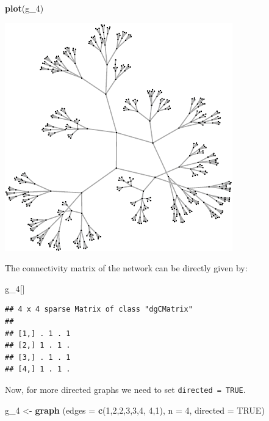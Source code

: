 \documentclass[]{article}
\newenvironment{Shaded}{\begin{snugshade}}{\end{snugshade}}
\newcommand{\KeywordTok}[1]{\textcolor[rgb]{0.13,0.29,0.53}{\textbf{#1}}}
\newcommand{\DataTypeTok}[1]{\textcolor[rgb]{0.13,0.29,0.53}{#1}}
\newcommand{\DecValTok}[1]{\textcolor[rgb]{0.00,0.00,0.81}{#1}}
\newcommand{\StringTok}[1]{\textcolor[rgb]{0.31,0.60,0.02}{#1}}
\newcommand{\OtherTok}[1]{\textcolor[rgb]{0.56,0.35,0.01}{#1}}
\newcommand{\NormalTok}[1]{#1}
\theoremstyle{definition}
\theoremstyle{definition}
\theoremstyle{definition}
\theoremstyle{remark}
\begin{document}
\begin{Shaded}
\begin{Highlighting}[]
\KeywordTok{plot}\NormalTok{(g_}\DecValTok{4}\NormalTok{)}
\end{Highlighting}
\end{Shaded}

\includegraphics{ResearchTools_files/figure-latex/unnamed-chunk-52-1.pdf}

The connectivity matrix of the network can be directly given by:

\begin{Shaded}
\begin{Highlighting}[]
\NormalTok{g_}\DecValTok{4}\NormalTok{[]}
\end{Highlighting}
\end{Shaded}

\begin{verbatim}
## 4 x 4 sparse Matrix of class "dgCMatrix"
##             
## [1,] . 1 . 1
## [2,] 1 . 1 .
## [3,] . 1 . 1
## [4,] 1 . 1 .
\end{verbatim}

Now, for more directed graphs we need to set \texttt{directed\ =\ TRUE}.

\begin{Shaded}
\begin{Highlighting}[]
\NormalTok{g_}\DecValTok{4}\NormalTok{ <-}\StringTok{ }\KeywordTok{graph}\NormalTok{ (}\DataTypeTok{edges =} \KeywordTok{c}\NormalTok{(}\DecValTok{1}\NormalTok{,}\DecValTok{2}\NormalTok{,}\DecValTok{2}\NormalTok{,}\DecValTok{3}\NormalTok{,}\DecValTok{3}\NormalTok{,}\DecValTok{4}\NormalTok{, }\DecValTok{4}\NormalTok{,}\DecValTok{1}\NormalTok{), }\DataTypeTok{n =} \DecValTok{4}\NormalTok{, }\DataTypeTok{directed =} \OtherTok{TRUE}\NormalTok{)}
\end{Highlighting}
\end{Shaded}
\end{document}
